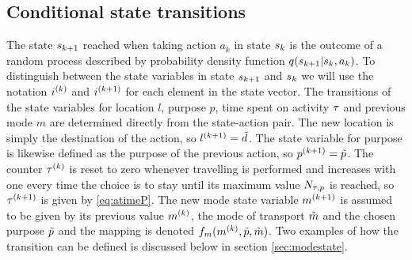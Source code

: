 \subsection{Conditional state transitions}
The state $s_{k+1}$ reached when taking action $a_k$ in state $s_{k}$ is the outcome of a random process described by probability density function $q(s_{k+1}|s_{k},a_k)$. To distinguish between the state variables in state $s_{k+1}$ and $s_{k}$ we will use the notation $i^{(k)}$ and $i^{(k+1)}$ for each element in the state vector.
The transitions of the state variables for location $l$, purpose $p$, time spent on activity $\tau$ and previous mode $m$ are determined directly from the state-action pair. The new location is simply the destination of the action, so $l^{(k+1)} = \tilde{d}$. The state variable for purpose is likewise defined as the purpose of the previous action, so $p^{(k+1)} = \tilde{p}$. 
The counter $\tau^{(k)}$ is reset to zero whenever travelling is performed and increases with one every time the choice is to stay until its maximum value $N_{\tau,p}$ is reached, so $\tau^{(k+1)}$ is given by \eqref{eq:atimeP}.
The new mode state variable $m^{(k+1)}$ is assumed to be given by its previous value $m^{(k)}$, the mode of transport $\tilde{m}$ and the chosen purpose $\tilde{p}$ and the mapping is denoted $f_m(m^{(k)},\tilde{p},\tilde{m})$. Two examples of how the transition can be defined is discussed below in section \ref{sec:modestate}.

